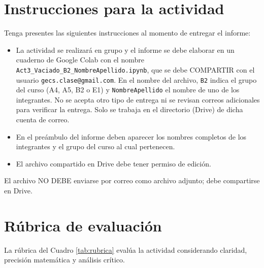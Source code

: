 \documentclass[oneside,letter,spanish,activeacute,english,links,10pt]{amcaGCS_EDO}
\begin{document}
\section{Instrucciones para la actividad}
Tenga presentes las siguientes instrucciones al momento de entregar el informe:
\begin{itemize}
	\item La actividad se realizará en grupo y el informe se debe elaborar en un cuaderno de Google Colab con el nombre
	\verb+Act3_Vaciado_B2_NombreApellido.ipynb+,
	que se debe COMPARTIR con el usuario \verb+gecs.clase@gmail.com+.
	En el nombre del archivo, \verb+B2+ indica el grupo del curso (A4, A5, B2 o E1) y \verb+NombreApellido+ el nombre de uno de los integrantes. No se acepta otro tipo de entrega ni se revisan correos adicionales para verificar la entrega. Solo se trabaja en el directorio (Drive) de dicha cuenta de correo.
	\item En el preámbulo del informe deben aparecer los nombres completos de los integrantes y el grupo del curso al cual pertenecen.
	\item El archivo compartido en Drive debe tener permiso de edición.
\end{itemize}

\bigskip{} El archivo NO DEBE enviarse por correo como archivo adjunto; debe compartirse en Drive.
\fi

\section{Rúbrica de evaluación}

La rúbrica del Cuadro \ref{tab:rubrica} evalúa la actividad considerando claridad, precisión matemática y análisis crítico.
\end{document}
